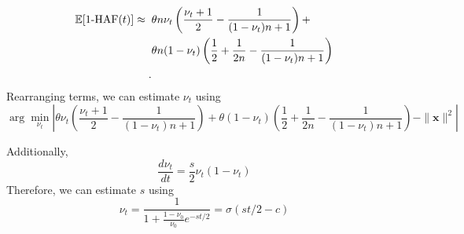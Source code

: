 \begin{align}
  \mathbb{E}[1\text{-HAF}(t)]\approx\;\; & \theta n \nu_t \left(\frac{\nu_t+1}{2} - \frac{1}{(1-\nu_t)n+1}\right) +\\
   & \theta n(1-\nu_t)\left(\frac{1}{2}+\frac{1}{2n}-\frac{1}{(1-\nu_t)n+1}\right) \\.
  \label{eq:hafscorepooled}
\end{align}
Rearranging terms, we can estimate $\nu_t$ using
\begin{equation}
\arg\min_{\nu_t} \left  \vert \theta \nu_t \left(\frac{\nu_t+1}{2} - \frac{1}{(1-\nu_t)n+1}\right) + \theta (1-\nu_t)\left(\frac{1}{2}+\frac{1}{2n}-\frac{1}{(1-\nu_t)n+1}\right) -\parallel \mathbf{x}\parallel^2 \right \vert
  \label{eq:pooledfrequency}
\end{equation}

Additionally,
\begin{equation}
  \frac{d\nu_t}{dt} = \frac{s}{2}\nu_t(1-\nu_t)   
\end{equation}
Therefore, we can estimate $s$ using
\begin{equation}
  \nu_t =\frac{1}{1+\frac{1-\nu_0}{\nu_0}e^{-st/2}} = \sigma(st/2-c) 
  \label{eq:labeledpooled_s}
\end{equation}

%


